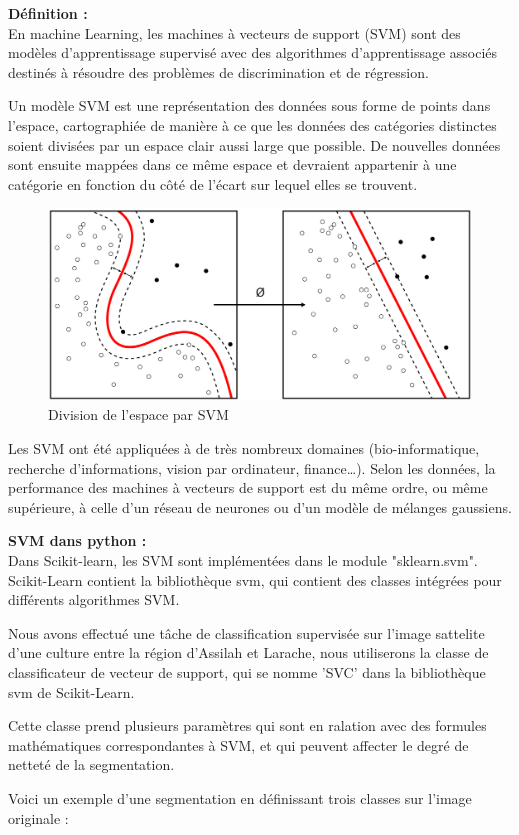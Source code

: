 \documentclass[12pt, openany]{report}
\begin{document}
\textbf{Définition :}\\
En machine Learning, les machines à vecteurs de support (SVM) sont des modèles d'apprentissage supervisé avec des algorithmes d'apprentissage associés destinés à résoudre des problèmes de discrimination et de régression. 
\par
Un modèle SVM est une représentation des données sous forme de points dans l'espace, cartographiée de manière à ce que les données des catégories distinctes soient divisées par un espace clair aussi large que possible. De nouvelles données sont ensuite mappées dans ce même espace et devraient appartenir à une catégorie en fonction du côté de l'écart sur lequel elles se trouvent.
\begin{figure}[H]
\centering
\includegraphics[scale=0.2]{svm.png}
\caption{Division de l'espace par SVM}
\end{figure}

\par
Les SVM ont été appliquées à de très nombreux domaines (bio-informatique, recherche d'informations, vision par ordinateur, finance…). Selon les données, la performance des machines à vecteurs de support est du même ordre, ou même supérieure, à celle d'un réseau de neurones ou d'un modèle de mélanges gaussiens.

\textbf{SVM dans python :} \\
Dans Scikit-learn, les SVM sont implémentées dans le module "sklearn.svm".
Scikit-Learn contient la bibliothèque svm, qui contient des classes intégrées pour différents algorithmes SVM. 
\par
Nous avons effectué une tâche de classification supervisée sur l'image sattelite d'une culture entre la région d'Assilah et Larache, nous utiliserons la classe de classificateur de vecteur de support, qui se nomme 'SVC' dans la bibliothèque svm de Scikit-Learn.
\par
Cette classe prend plusieurs paramètres qui sont en ralation avec des formules mathématiques correspondantes à SVM, et qui peuvent affecter le degré de netteté de la segmentation.
\par
Voici un exemple d'une segmentation en définissant trois classes sur l'image originale : 
\end{document}
